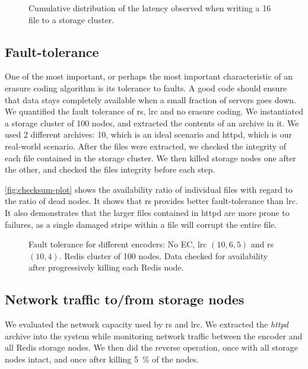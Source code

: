 \begin{figure}[th]
    \centering
    
    \caption{Cumulative distribution of the latency observed when writing a \SI{16}{\mebi\byte} file to a storage cluster.}
    \label{fig:latency-plot}
\end{figure}

\subsection{Fault-tolerance}
\label{subsec:fault-tolerance}

One of the most important, or perhaps the most important characteristic of an erasure coding algorithm is its tolerance to faults.
A good code should ensure that data stays completely available when a small fraction of servers goes down.
We quantified the fault tolerance of \acf{rs}, \acf{lrc} and no erasure coding.
We instantiated a storage cluster of 100 nodes, and extracted the contents of an archive in it.
We used 2 different archives: \SI{10}{\byte}, which is an ideal scenario and httpd, which is our real-world scenario.
After the files were extracted, we checked the integrity of each file contained in the storage cluster.
We then killed storage nodes one after the other, and checked the files integrity before each step.

\autoref{fig:checksum-plot} shows the availability ratio of individual files with regard to the ratio of dead nodes.
It shows that \ac{rs} provides better fault-tolerance than \ac{lrc}.
It also demonstrates that the larger files contained in httpd are more prone to failures, as a single damaged stripe within a file will corrupt the entire file.

\begin{figure}[t]
    \centering
    
    \caption{Fault tolerance for different encoders: No EC, \ac{lrc} $\left(10,6,5\right)$ and \ac{rs} $\left(10,4\right)$. Redis cluster of 100 nodes. Data checked for availability after progressively killing each Redis node.}
    \label{fig:checksum-plot}
\end{figure}


\subsection{Network traffic to/from storage nodes}
\label{subsec:network-traffic}

We evaluated the network capacity used by \ac{rs} and \ac{lrc}.
We extracted the \textit{httpd} archive into the system while monitoring network traffic between the encoder and all Redis storage nodes.
We then did the reverse operation, once with all storage nodes intact, and once after killing \SI{5}{\percent} of the nodes.

